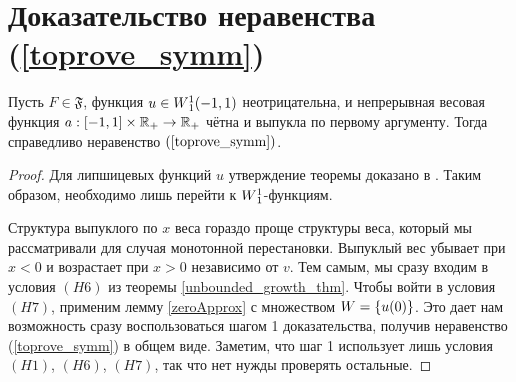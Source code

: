 \section{Доказательство неравенства (\ref{toprove_symm})}
\label{sobolevSymm}


\begin{thm}
\label{symmThm}
Пусть $F \in \mathfrak{F}$, функция $u \in W{}_1^1(-1, 1)$ неотрицательна,
и непрерывная весовая функция $a: [-1, 1] \times \mathbb R_+ \to \mathbb R_+$ чётна и выпукла по первому аргументу.
Тогда справедливо неравенство $(\ref{toprove_symm})$.
\end{thm}

\begin{proof}
Для липшицевых функций $u$ утверждение теоремы доказано в \cite{Brock}.
Таким образом, необходимо лишь перейти к $W{}_1^1$-функциям.

Структура выпуклого по $x$ веса гораздо проще структуры веса,
который мы рассматривали для случая монотонной перестановки.
Выпуклый вес убывает при $x < 0$ и возрастает при $x > 0$ независимо от $v$.
Тем самым, мы сразу входим в условия $(H6)$ из теоремы \ref{unbounded_growth_thm}.
Чтобы войти в условия $(H7)$, применим лемму \ref{zeroApprox} с множеством $W = \{u(0)\}$.
Это дает нам возможность сразу воспользоваться шагом 1 доказательства,
получив неравенство (\ref{toprove_symm}) в общем виде.
Заметим, что шаг 1 использует лишь условия $(H1)$, $(H6)$, $(H7)$, так что нет нужды проверять остальные.
\end{proof}
